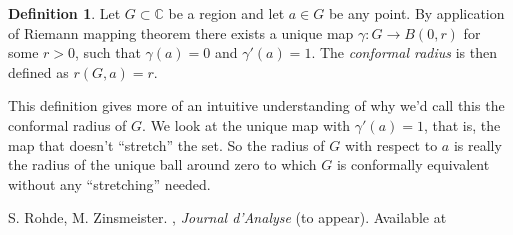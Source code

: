 \documentclass[12pt]{article}
\theoremstyle{theorem}
\theoremstyle{definition}
\newtheorem*{defn}{Definition}
\begin{document}
\begin{defn}
Let $G \subset {\mathbb{C}}$ be a region and let $a \in G$ be any
point.  By application of Riemann mapping
theorem there exists a unique map $\gamma \colon G \to B(0,r)$ for
some $r > 0$, such that $\gamma(a) = 0$ and $\gamma'(a) = 1$.  The
{\em conformal radius} is then defined as $r(G,a) = r$. 
\end{defn}

This definition gives more of an intuitive understanding of why we'd call this the conformal radius of $G$.  We look at the unique map with $\gamma'(a) = 1$, that is, the map that doesn't ``stretch'' the set.  So the radius of $G$
with respect to $a$ is really the radius of the unique ball around zero to which $G$ is conformally equivalent without any ``stretching'' needed.

\begin{thebibliography}{9}
S. Rohde, M. Zinsmeister.  , \emph{Journal d'Analyse} (to appear).
Available at
\end{thebibliography}
\end{document}
